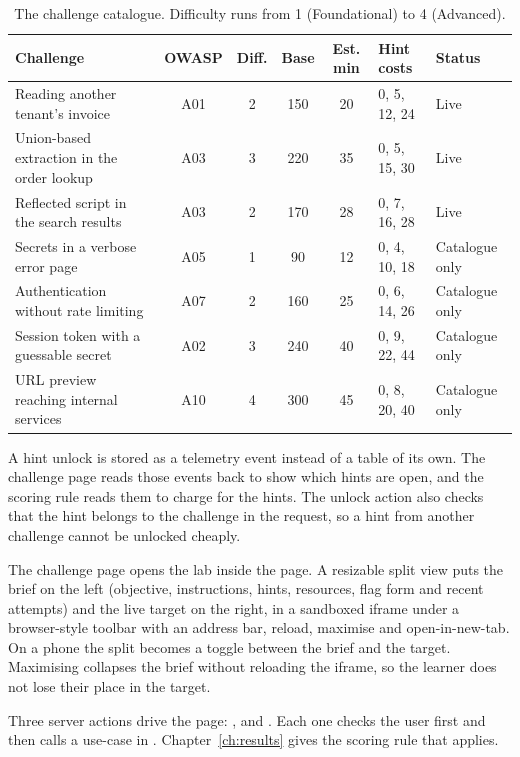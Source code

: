 \begin{table}[!htbp]
\centering
\caption{The challenge catalogue. Difficulty runs from 1 (Foundational) to 4 (Advanced).}
\label{tab:catalogue}
\tablefont
\begin{tabularx}{\linewidth}{@{}L c c c c P{2.2cm} P{1.8cm}@{}}
\toprule
\textbf{Challenge} & \textbf{OWASP} & \textbf{Diff.} & \textbf{Base} & \textbf{Est. min} & \textbf{Hint costs} & \textbf{Status} \\
\midrule
Reading another tenant's invoice & A01 & 2 & 150 & 20 & 0, 5, 12, 24 & Live \\
Union-based extraction in the order lookup & A03 & 3 & 220 & 35 & 0, 5, 15, 30 & Live \\
Reflected script in the search results & A03 & 2 & 170 & 28 & 0, 7, 16, 28 & Live \\
Secrets in a verbose error page & A05 & 1 & 90 & 12 & 0, 4, 10, 18 & Catalogue only \\
Authentication without rate limiting & A07 & 2 & 160 & 25 & 0, 6, 14, 26 & Catalogue only \\
Session token with a guessable secret & A02 & 3 & 240 & 40 & 0, 9, 22, 44 & Catalogue only \\
URL preview reaching internal services & A10 & 4 & 300 & 45 & 0, 8, 20, 40 & Catalogue only \\
\bottomrule
\end{tabularx}
\end{table}

A hint unlock is stored as a  telemetry event instead of a table of its own. The challenge page reads those events back to show which hints are open, and the scoring rule reads them to charge for the hints. The unlock action also checks that the hint belongs to the challenge in the request, so a hint from another challenge cannot be unlocked cheaply.

The challenge page opens the lab inside the page. A resizable split view puts the brief on the left (objective, instructions, hints, resources, flag form and recent attempts) and the live target on the right, in a sandboxed iframe under a browser-style toolbar with an address bar, reload, maximise and open-in-new-tab. On a phone the split becomes a toggle between the brief and the target. Maximising collapses the brief without reloading the iframe, so the learner does not lose their place in the target.

Three server actions drive the page: ,  and . Each one checks the user first and then calls a use-case in . Chapter~\ref{ch:results} gives the scoring rule that  applies.

